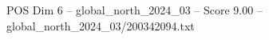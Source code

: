 \begin{textsample}{POS Dim 6 – global\_north\_2024\_03 – Score 9.00 – global\_north\_2024\_03/200342094.txt}
\end{textsample}
